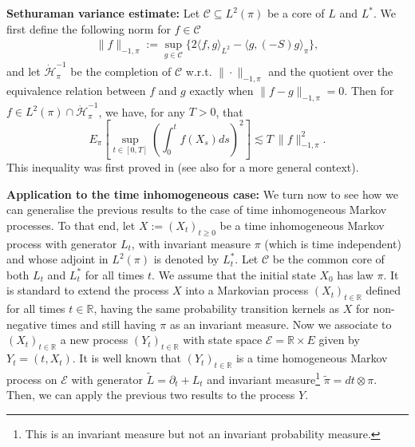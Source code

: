 \documentclass[a4paper, reqno, 12pt]{amsart}
\theoremstyle{plain}
\theoremstyle{definition}
\begin{document}
\textbf{Sethuraman variance estimate:} Let $\mathcal C\subseteq L^2(\pi)$ be a core of $L$ and $L^{\ast}$. 
We first define the following norm for $f\in \mathcal C$
\begin{align*}
    \|f\|_{-1,\pi} := \sup_{g\in\mathcal C}\big\{ 2\langle f,g\rangle_{L^2} - \langle g, (-S)g\rangle_{\pi}\big\},
\end{align*}
and let $\dot{\mathcal H}^{-1}_\pi$ be the completion of $\mathcal C$ w.r.t. $\|\cdot\|_{-1,\pi}$ and the quotient over the equivalence relation between $f$ and $g$ exactly when $\|f-g\|_{-1,\pi} = 0$. Then for $f\in L^2(\pi)\cap \dot{\mathcal H}^{-1}_{\pi}$, we have, for any $T>0$, that
\begin{equation} \label{eq:generalvariancest}
 E_{\pi}\left[  \sup_{t\in[0,T]} \left( \int_0^t f(X_s) ds \right)^2 \right] \lesssim T\ \| f \|_{-1,\pi}^2.
\end{equation}
This inequality was first proved in \cite[Lemma 3.9]{S00} (see also  \cite[Chapter 2]{KLO12} for a more general context).

\bigskip

\textbf{Application to the time inhomogeneous case:} We turn now to see how we can generalise the previous results to the case of time inhomogeneous Markov processes. To that end, let $X:=(X_t)_{t\ge 0}$ be a time inhomogeneous Markov process with generator $L_t$, with invariant measure $\pi$ (which is time independent) and whose adjoint in $L^2(\pi)$ is denoted by $L^*_t$. Let $\mathcal C$ be the common core of both $L_t$ and $L^*_t$ for all times $t$. We assume that the initial state $X_0$ has  law $\pi$. It is standard to extend the process $X$ into a Markovian process $(X_t)_{t \in \mathbb R}$ defined for all times $t \in \mathbb R$, having the same probability transition kernels as $X$ for non-negative times and still having $\pi$ as an invariant measure. Now we associate to $(X_t)_{t\in \mathbb R}$ a new process $(Y_t)_{t\in \mathbb R}$ with state space $\mathcal E=\mathbb R\times E$ given by $Y_t=(t,X_t)$. It is well known that $(Y_t)_{t\in \mathbb R}$ is a time homogeneous Markov process on $\mathcal E$ with generator $\tilde L=\partial_t + L_t$ and invariant measure{\footnote{This is an invariant measure but not an invariant probability measure.}} $\tilde\pi = dt\otimes \pi$. Then, we can apply the previous two results to the process $Y$.
\medskip
\end{document}
